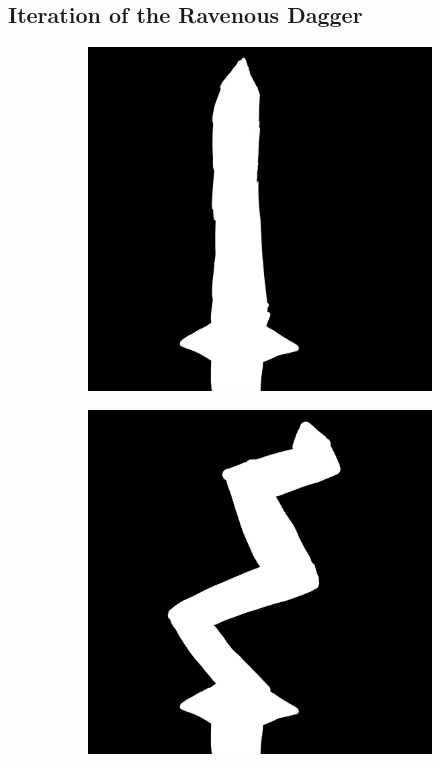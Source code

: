 \documentclass{article}
\begin{document}
\pagebreak

\subsection{Iteration of the Ravenous Dagger} \label{Iteration7}

\begin{figure}[h]
    \centering
    \caption{}
    \label{fig:Iteration7}
    \begin{subfigure}{0.49\textwidth}
        \includegraphics[width=1\textwidth]{drawings/RavenousDagger1.png}
        \caption{}
        \label{fig:Iteration7.1}
    \end{subfigure}
    \begin{subfigure}{0.49\textwidth}
        \includegraphics[width=1\textwidth]{drawings/RavenousDagger2.png}

\end{subfigure}
\end{figure}
\end{document}
